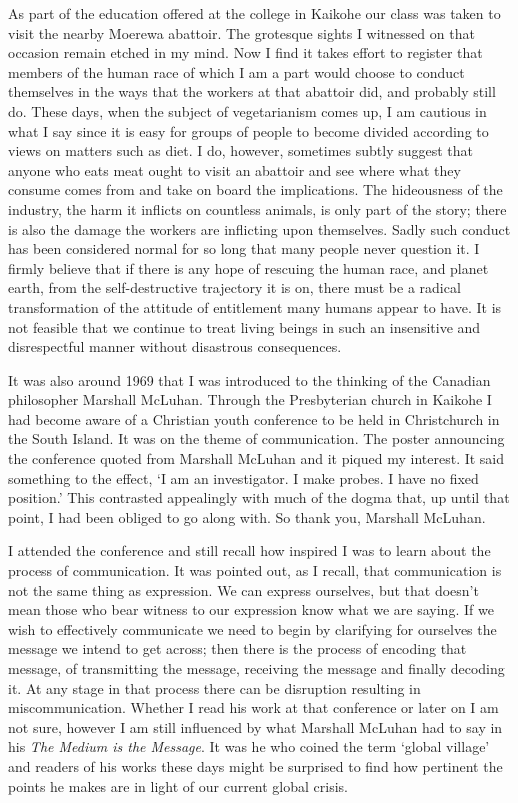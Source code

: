 As part of the education offered at the college in Kaikohe our class was
taken to visit the nearby Moerewa abattoir. The grotesque sights I
witnessed on that occasion remain etched in my mind. Now I find it takes
effort to register that members of the human race of which I am a part
would choose to conduct themselves in the ways that the workers at that
abattoir did, and probably still do. These days, when the subject of
vegetarianism comes up, I am cautious in what I say since it is easy for
groups of people to become divided according to views on matters such as
diet. I do, however, sometimes subtly suggest that anyone who eats meat
ought to visit an abattoir and see where what they consume comes from
and take on board the implications. The hideousness of the industry, the
harm it inflicts on countless animals, is only part of the story; there
is also the damage the workers are inflicting upon themselves. Sadly
such conduct has been considered normal for so long that many people
never question it. I firmly believe that if there is any hope of
rescuing the human race, and planet earth, from the self-destructive
trajectory it is on, there must be a radical transformation of the
attitude of entitlement many humans appear to have. It is not feasible
that we continue to treat living beings in such an insensitive and
disrespectful manner without disastrous consequences.

It was also around 1969 that I was introduced to the thinking of the
Canadian philosopher Marshall McLuhan\cite{mcluhan}.
Through the Presbyterian church in Kaikohe I had
become aware of a Christian youth conference to be held in Christchurch
in the South Island. It was on the theme of communication. The poster
announcing the conference quoted from Marshall McLuhan and it piqued my
interest. It said something to the effect, `I am an investigator. I make
probes. I have no fixed position.' This contrasted appealingly with much
of the dogma that, up until that point, I had been obliged to go along
with. So thank you, Marshall McLuhan.

I attended the conference and still recall how inspired I was to learn
about the process of communication. It was pointed out, as I recall,
that communication is not the same thing as expression. We can express
ourselves, but that doesn't mean those who bear witness to our
expression know what we are saying. If we wish to effectively
communicate we need to begin by clarifying for ourselves the message we
intend to get across; then there is the process of encoding that
message, of transmitting the message, receiving the message and finally
decoding it. At any stage in that process there can be disruption
resulting in miscommunication. Whether I read his work at that
conference or later on I am not sure, however I am still influenced by
what Marshall McLuhan had to say in his \emph{The Medium is the
Message}. It was he who coined the term `global village' and readers of
his works these days might be surprised to find how pertinent the points
he makes are in light of our current global crisis.

